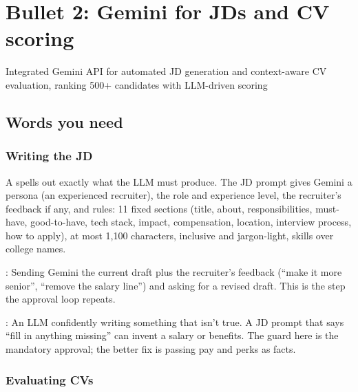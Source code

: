 \chapter{Bullet 2: Gemini for JDs and CV scoring}
\label{ch:gemini}

\begin{cvline}
Integrated Gemini API for automated JD generation and context-aware CV evaluation, ranking 500+ candidates with LLM-driven scoring
\end{cvline}

\section{Words you need}

\subsection*{Writing the JD}

\begin{definition}
A  spells out exactly what the LLM must produce. The JD prompt gives Gemini a persona (an experienced recruiter), the role and experience level, the recruiter's feedback if any, and rules: 11 fixed sections (title, about, responsibilities, must-have, good-to-have, tech stack, impact, compensation, location, interview process, how to apply), at most 1,100 characters, inclusive and jargon-light, skills over college names.
\end{definition}

\begin{definition}[Refinement]
: Sending Gemini the current draft plus the recruiter's feedback (``make it more senior'', ``remove the salary line'') and asking for a revised draft. This is the step the approval loop repeats.
\end{definition}

\begin{definition}[Hallucination]
: An LLM confidently writing something that isn't true. A JD prompt that says ``fill in anything missing'' can invent a salary or benefits. The guard here is the mandatory approval; the better fix is passing pay and perks as facts.
\end{definition}

\subsection*{Evaluating CVs}

